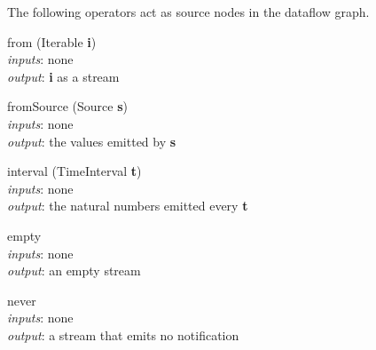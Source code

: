 \documentclass{dithesis}
\begin{document}
The following operators act as source nodes in the dataflow graph.
\begin{description}

\begin{minipage}[c]{0.4\linewidth}
\item[from](Iterable \textbf{i}) \\ 	
	\textit{inputs}: none \\
	\textit{output}: \textbf{i} as a stream \\
\end{minipage}
\begin{minipage}[c]{0.6\linewidth}

\end{minipage}

\begin{minipage}[c]{0.4\linewidth}
\item[fromSource](Source \textbf{s}) \\ 
	\textit{inputs}: none \\
	\textit{output}: the values emitted by \textbf{s} \\
\end{minipage}
	
\begin{minipage}[c]{0.4\linewidth}
\item[interval](TimeInterval \textbf{t}) \\ 
	\textit{inputs}: none \\
	\textit{output}: the natural numbers emitted every \textbf{t} \\
\end{minipage}
\begin{minipage}[c]{0.6\linewidth}

\end{minipage}
	
\begin{minipage}[c]{0.4\linewidth}
\item[empty] ~\\ 
	\textit{inputs}: none \\
	\textit{output}: an empty stream \\
\end{minipage}
\begin{minipage}[c]{0.6\linewidth}

\end{minipage}

\begin{minipage}[c]{0.4\linewidth}
\item[never] ~\\ 
	\textit{inputs}: none \\
	\textit{output}: a stream that emits no notification \\
\end{minipage}
\begin{minipage}[c]{0.6\linewidth}

\end{minipage}


\end{description}
\end{document}
